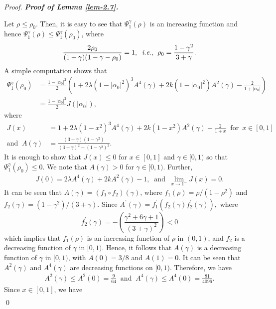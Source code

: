 \documentclass[a4paper,12pt]{amsart}
\theoremstyle{plain}
\theoremstyle{definition}
\newenvironment{pf}[1][]{%
 \vskip 3mm
 \noindent
 \ifthenelse{\equal{#1}{}}%
  {{\slshape Proof. }}%
  {{\slshape #1.} }%
 }%
{\qed\bigskip}
\begin{document}
\begin{pf}[\bf Proof of Lemma \ref{lem-2.7}]
	Let $ \rho\leq \rho_0 $. Then, it is easy to see that $\Psi_1^{\gamma}(\rho)$ is an increasing function and hence $ 	\Psi_1^{\gamma}(\rho)\leq 	\Psi_1^{\gamma}(\rho_0) $, where 
	\begin{align*}
		\frac{2\rho_0}{(1+\gamma)(1-\gamma-\rho_0)}=1,\;\;\text{\it i.e.,}\;\; \rho_0=\frac{1-\gamma^2}{3+\gamma}.
	\end{align*}
	A simple computation shows that 
	\begin{align*}
		\Psi_1^{\gamma}(\rho_0)&=\frac{1-|\alpha_0|^2}{2}\left(1+2\lambda(1-|\alpha_0|^2)^3A^4(\gamma)+2k(1-|\alpha_0|^2)A^2(\gamma)-\frac{2}{1+|\alpha_0|}\right)\\&=\frac{1-|\alpha_0|^2}{2}J(|\alpha_0|),
	\end{align*}
	where 
	\begin{align*}
		J(x)&=1+2\lambda(1-x^2)^3A^4(\gamma)+2k(1-x^2)A^2(\gamma)-\frac{2}{1+x}\;\; \mbox{for}\;\ x\in [0,1]\\\text{and}\;\; A(\gamma)&=\frac{(3+\gamma)(1-\gamma^2)}{(3+\gamma)^2-(1-\gamma^2)^2}.
	\end{align*}
	It is enough to show that $ J(x)\leq 0 $ for $ x\in [0,1] $ and $ \gamma\in [0,1) $ so that $ 	\Psi_1^{\gamma}(\rho_0)\leq 0 $. We note that $ A(\gamma)>0 $ for $ \gamma\in [0,1) $. Further,
	\begin{align*}
		J(0)=2\lambda A^4(\gamma)+2kA^2(\gamma)-1, \;\; \text{and}\;\; \lim_{x\rightarrow 1^{-}}J(x)=0.
	\end{align*}
	It can be seen that $ A(\gamma)=(f_1\circ f_2)(\gamma) $, where $ f_1(\rho)=\rho/(1-\rho^2) $ and $ f_2(\gamma)=(1-\gamma^2)/(3+\gamma). $
	Since $ A^{\prime}(\gamma)=f^{\prime}_1(f_2(\gamma)f^{\prime}_2(\gamma)), $ where 
	\begin{equation}
		f^{\prime}_2(\gamma)=-\left(\frac{\gamma^2+6\gamma+1}{(3+\gamma)^2}\right)<0
	\end{equation}
	which implies that $ f_1(\rho) $ is an increasing function of $ \rho $ in $ (0,1) $, and $ f_2 $ is a decreasing function of $ \gamma $ in $ [0,1) $. Hence, it follows that $ A(\gamma) $ is a decreasing function of $ \gamma $  in $ [0,1) $, with $ A(0)=3/8 $ and $ A(1)=0 $. It can be seen that $ A^2(\gamma) $ and $ A^4(\gamma) $ are decreasing functions on $ [0,1) $. Therefore, we have 
	\begin{align*}
		A^2(\gamma)\leq A^2(0)=\frac{9}{64}\;\; \text{and}\;\; A^4(\gamma)\leq A^4(0)=\frac{81}{4096}.
	\end{align*}
	Since $ x\in [0,1] $, we have
	\begin{align*}

\end{align*}
\end{pf}
\end{document}
